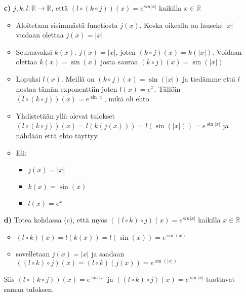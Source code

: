 \documentclass{article}
\begin{document}
\begin{itemize}
        \item[\textbf{c)}] $j, k, l : \mathbb{R} \rightarrow \mathbb{R}$, että $(l \circ (k \circ j))(x) = e^{sin |x|}$ kaikilla $x \in \mathbb{R}$
        \begin{itemize}
            \item Aloitetaan sisimmästä functiosta $j(x)$. Koska oikealla on lauseke $|x|$ voidaan olettaa $j(x) = |x|$
            \item Seuraavaksi $k(x)$. $j(x) = |x|$, joten $(k \circ j)(x) = k(|x|)$. Voidaan olettaa $k(x) = \sin(x)$ josta sauraa $(k \circ j)(x) = \sin(|x|)$
            \item Lopuksi $l(x)$. Meillä on $(k \circ j)(x) = \sin(|x|)$ ja tiedämme että $l$ nostaa tämän exponenttiin joten $l(x) = e^x$. Tällöin $(l \circ (k \circ j))(x) = e^{\sin |x|}$, mikä oli ehto.
            \item Yhdistetään yllä olevat tulokset $(l \circ (k \circ j))(x) = l(k(j(x))) = l(\sin(|x|)) = e^{\sin |x|}$ ja nähdään että ehto täyttyy.
            \item Eli:
            \begin{itemize}
                \item $j(x) = |x|$
                \item $k(x) = \sin(x)$
                \item $l(x) = e^x$
            \end{itemize}
        \end{itemize}
\pagebreak
        \item[\textbf{d)}] Totea kohdassa (c), että myös $((l \circ k) \circ j)(x) = e^{sin |x|}$ kaikilla $x \in \mathbb{R}$
        \begin{itemize}
            \item $(l \circ k)(x) = l(k(x)) = l(\sin(x)) = e^{\sin(x)}$
            \item sovelletaan $j(x) = |x|$ ja saadaan $((l \circ k) \circ j)(x) = (l \circ k)(j(x)) = e^{\sin(|x|)}$
        \end{itemize}
        Siis $(l \circ (k \circ j))(x) = e^{\sin |x|}$ ja $((l \circ k) \circ j)(x) = e^{\sin |x|}$ tuottavat saman tuloksen.
\end{itemize}
\end{document}
